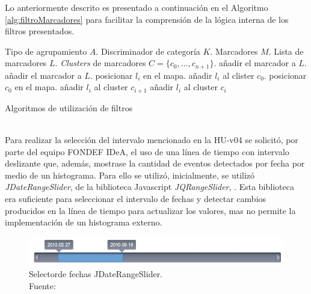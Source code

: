 Lo anteriormente descrito es presentado a continuación en el Algoritmo \ref{alg:filtroMarcadores} para facilitar la comprensión de la lógica interna de los filtros presentados.\\

\begin{algorithm}[H]
	\begin{algorithmic}
		\REQUIRE Tipo de agrupamiento $A$.
		\REQUIRE Discriminador de categoría $K$.
		\REQUIRE Marcadores $M$.
		\STATE Lista de marcadores $L$.
		\STATE \textit{Clusters} de marcadores $C = \{c_{0}, \dots, c_{n+1} \}$.
				\STATE añadir el marcador a $L$.
				\STATE añadir el marcador a $L$.
			\ENDIF
		\ENDFOR
				\STATE posicionar $l_{i}$ en el mapa.
			\ENDFOR
				\STATE añadir $l_{i}$ al clister $c_{0}$.
			\ENDFOR
			\STATE posicionar $c_{0}$ en el mapa.
		\ELSE
				\STATE añadir $l_{i}$ al cluster $c_{i+1}$
			\ENDFOR
				\STATE añadir $l_{i}$ al cluster $c_{i}$
			\ENDFOR
		\ENDIF
	\end{algorithmic}
	\caption{Algoritmos de utilización de filtros}
	\label{alg:filtroMarcadores}
\end{algorithm}\vphantom\\

Para realizar la selección del intervalo mencionado en la HU-v04 se solicitó, por parte del equipo FONDEF IDeA, el uso de una línea de tiempo con intervalo deslizante que, además, mostrase la cantidad de eventos detectados por fecha por medio de un histograma. Para ello se utilizó, inicialmente, se utilizó \textit{JDateRangeSlider}, de la biblioteca Javascript \textit{JQRangeSlider}, \cite{JQRangeSlider}. Esta biblioteca era suficiente para seleccionar el intervalo de fechas y detectar cambios producidos en la línea de tiempo para actualizar los valores, mas no permite la implementación de un histograma externo.

\begin{figure}[H]
	\centering
	\captionsetup{justification=centering}
	\includegraphics[scale=0.6]{images/JDateRangeSlider.png}
	\caption[Selectorde fechas JDateRangeSlider.]{Selectorde fechas JDateRangeSlider.\\Fuente: \cite{JQRangeSlider}}
	\label{fig:JQRangeSlider}
\end{figure}

